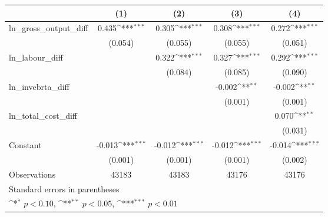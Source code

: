 {
\def\sym#1{\ifmmode^{#1}\else\(^{#1}\)\fi}
\begin{tabular}{l*{4}{c}}
\hline\hline
                &\multicolumn{1}{c}{(1)}         &\multicolumn{1}{c}{(2)}         &\multicolumn{1}{c}{(3)}         &\multicolumn{1}{c}{(4)}         \\
\hline
ln\_gross\_output\_diff&    0.435\sym{***}&    0.305\sym{***}&    0.308\sym{***}&    0.272\sym{***}\\
                &  (0.054)         &  (0.055)         &  (0.055)         &  (0.051)         \\
[1em]
ln\_labour\_diff  &                  &    0.322\sym{***}&    0.327\sym{***}&    0.292\sym{***}\\
                &                  &  (0.084)         &  (0.085)         &  (0.090)         \\
[1em]
ln\_invebrta\_diff&                  &                  &   -0.002\sym{**} &   -0.002\sym{**} \\
                &                  &                  &  (0.001)         &  (0.001)         \\
[1em]
ln\_total\_cost\_diff&                  &                  &                  &    0.070\sym{**} \\
                &                  &                  &                  &  (0.031)         \\
[1em]
Constant        &   -0.013\sym{***}&   -0.012\sym{***}&   -0.012\sym{***}&   -0.014\sym{***}\\
                &  (0.001)         &  (0.001)         &  (0.001)         &  (0.002)         \\
\hline
Observations    &    43183         &    43183         &    43176         &    43176         \\
\hline\hline
\multicolumn{5}{l}{\footnotesize Standard errors in parentheses}\\
\multicolumn{5}{l}{\footnotesize \sym{*} \(p<0.10\), \sym{**} \(p<0.05\), \sym{***} \(p<0.01\)}\\
\end{tabular}
}
